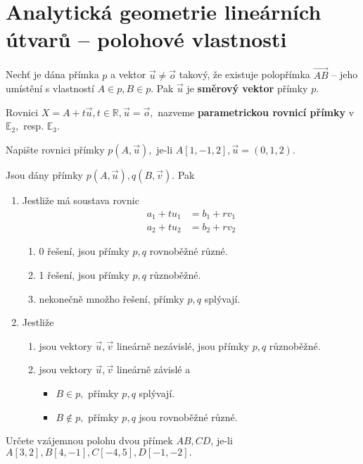 \section{Analytická geometrie lineárních útvarů -- polohové vlastnosti}
\begin{definition}
    Nechť je dána přímka $p$ a vektor $\vec u\ne \vec o$
    takový, že existuje polopřímka $\overrightarrow{AB}$ --
    jeho umístění s vlastností $A\in p, B\in p.$ Pak $\vec u$
    je \textbf{směrový vektor} přímky $p.$
\end{definition}

\begin{definition}
    Rovnici $X = A+t\vec u, t\in \mathbb R, \vec u = \vec o,$ nazveme
    \textbf{parametrickou rovnicí přímky} v $\mathbb E_2,$ resp. $\mathbb E_3.$
\end{definition}

\begin{priklad}
Napište rovnici přímky $p(A,\vec u),$ je-li $A[1,-1,2], \vec u = (0,1,2).$
\end{priklad}

\begin{veta}
    Jsou dány přímky $p(A,\vec u), q(B,\vec v).$ Pak
    \begin{enumerate}[$i.$]
    \item Jestliže má soustava rovnic
    \begin{align*}
        a_1+tu_1 &= b_1 + rv_1 \\
        a_2+tu_2 &= b_2 + rv_2
    \end{align*}
    \begin{enumerate}[$a.$]
    \item 0 řešení, jsou přímky $p,q$ rovnoběžné různé.
   	\item 1 řešení, jsou přímky $p,q$ různoběžné.
   	\item nekonečně množho řešení, přímky $p,q$ splývají.
    \end{enumerate}
   	\item Jestliže
    \begin{enumerate}[$a.$]
    \item jsou vektory $\vec u, \vec v$ lineárně nezávislé, jsou přímky $p,q$ různoběžné.
   	\item jsou vektory $\vec u, \vec v$ lineárně závislé a
   	\begin{itemize}
    \item $B\in p,$ přímky $p,q$ splývají.
   	\item $B\notin p,$ přímky $p,q$ jsou rovnoběžné různé.
    \end{itemize}
    \end{enumerate}
    \end{enumerate}
\end{veta}
\begin{priklad}
Určete vzájemnou polohu dvou přímek $AB, CD$, je-li $A[3,2], B[4,-1], C[-4,5],D[-1,-2].$
\end{priklad}


